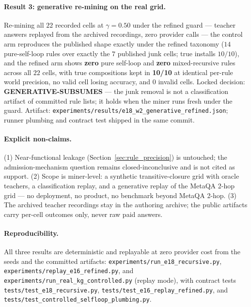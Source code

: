 \paragraph{Result 3: generative re-mining on the real grid.}
Re-mining all $22$ recorded cells at $\gamma{=}0.50$ under the refined
guard --- teacher answers replayed from the archived recordings, zero
provider calls --- the control arm reproduces the published shape exactly
under the refined taxonomy ($14$ pure-self-loop rules over exactly the $7$
published junk cells; true installs $10/10$), and the refined arm shows
\textbf{zero} pure self-loop and \textbf{zero} mixed-recursive rules across
all $22$ cells, with true compositions kept in \textbf{10/10} at identical
per-rule world precision, no valid cell losing accuracy, and $0$ invalid
cells. Locked decision: \textbf{GENERATIVE-SUBSUMES} --- the junk removal
is not a classification artifact of committed rule lists; it holds when
the miner runs fresh under the guard. Artifact:
\texttt{experiments/results/e18\_w2\_generative\_refined.json}; runner
plumbing and contract test shipped in the same commit.

\paragraph{Explicit non-claims.}
(1) Near-functional leakage (Section~\ref{sec:rule_precision}) is
untouched; the admission-mechanism question remains closed-inconclusive
and is not cited as support. (2) Scope is miner-level: a synthetic
transitive-closure grid with oracle teachers, a classification replay, and
a generative replay of the MetaQA 2-hop grid --- no deployment, no
product, no benchmark beyond MetaQA 2-hop. (3) The archived teacher
recordings stay in the authoring archive; the public artifacts carry
per-cell outcomes only, never raw paid answers.

\paragraph{Reproducibility.}
All three results are deterministic and replayable at zero provider cost
from the seeds and the committed artifacts:
\texttt{experiments/run\_e18\_recursive.py},
\texttt{experiments/replay\_e16\_refined.py}, and
\texttt{experiments/run\_real\_kg\_controlled.py} (replay mode), with
contract tests \texttt{tests/test\_e18\_recursive.py},
\texttt{tests/test\_e16\_replay\_refined.py}, and
\texttt{tests/test\_controlled\_selfloop\_plumbing.py}.
